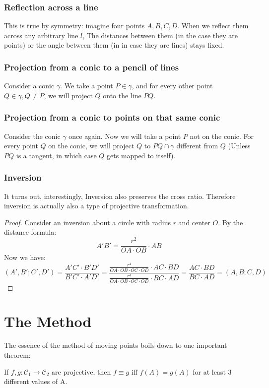 \documentclass{article}
\theoremstyle{mytheoremstyle}
\theoremstyle{mytheoremstyle}
\theoremstyle{myproblemstyle}
\begin{document}
    \subsubsection{Reflection across a line}
    This is true by symmetry: imagine four points $A, B, C, D$. When we reflect them across any arbitrary line $l$, The distances between them (in the case they are points) or the angle between them (in in case they are lines) stays fixed.

    \subsubsection{Projection from a conic to a pencil of lines}

    Consider a conic $\gamma$. We take a point $P \in \gamma$, and for every other point $Q \in \gamma, Q \not= P$, we will project $Q$ onto the line $PQ$. 

    \subsubsection{Projection from a conic to points on that same conic}
    Consider the conic $\gamma$ once again. Now we will take a point $P$ not on the conic. For every point $Q$ on the conic, we will project $Q$ to $PQ \cap \gamma$ different from $Q$ (Unless $PQ$ is a tangent, in which case $Q$ gets mapped to itself).

    \subsubsection{Inversion}
    It turns out, interestingly, Inversion also preserves the cross ratio. Therefore inversion is actually also a type of projective transformation.
    \begin{proof}
        Consider an inversion about a circle with radius $r$ and center $O$. By the distance formula: \[A'B' = \frac{r^2}{OA \cdot OB} \cdot AB\]
        Now we have: 
        \[(A', B'; C', D') = \frac{A'C' \cdot B'D'}{B'C' \cdot A'D'} = \frac{\frac{r^4}{OA \cdot OB \cdot OC \cdot OD} \cdot AC \cdot BD}{\frac{r^4}{OA \cdot OB \cdot OC \cdot OD} \cdot BC \cdot AD} = \frac{AC \cdot BD}{BC \cdot AD} = (A, B; C, D)\]
    \end{proof}

    \section{The Method}
    The essence of the method of moving points boils down to one important theorem:
    \begin{theorem}
        If $f, g: \mathcal{C}_1 \to \mathcal{C}_2$ are projective, then $f \equiv g$ iff $f(A)=g(A)$ for at least 3 different values of A. 
    \end{theorem}
\end{document}
